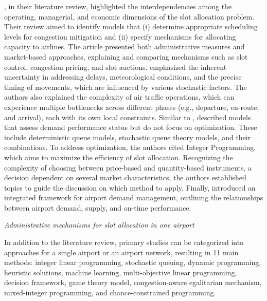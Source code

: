 , in their literature review, highlighted the interdependencies among the operating, managerial, and economic dimensions of the slot allocation problem. Their review aimed to identify models that (i) determine appropriate scheduling levels for congestion mitigation and (ii) specify mechanisms for allocating capacity to airlines. The article presented both administrative measures and market-based approaches, explaining and comparing mechanisms such as slot control, congestion pricing, and slot auctions.  emphasized the inherent uncertainty in addressing delays, meteorological conditions, and the precise timing of movements, which are influenced by various stochastic factors. The authors also explained the complexity of air traffic operations, which can experience multiple bottlenecks across different phases (e.g., departure, en-route, and arrival), each with its own local constraints. Similar to ,  described models that assess demand performance status but do not focus on optimization. These include deterministic queue models, stochastic queue theory models, and their combinations. To address optimization, the authors cited Integer Programming, which aims to maximize the efficiency of slot allocation. Recognizing the complexity of choosing between price-based and quantity-based instruments, a decision dependent on several market characteristics, the authors established topics to guide the discussion on which method to apply. Finally,  introduced an integrated framework for airport demand management, outlining the relationships between airport demand, supply, and on-time performance.

\hfill \break
\textit{Administrative mechanisms for slot allocation in one airport}
\hfill \break

In addition to the literature review, primary studies can be categorized into approaches for a single airport or an airport network, resulting in 11 main methods: integer linear programming, stochastic queuing, dynamic programming, heuristic solutions, machine learning, multi-objective linear programming, decision framework, game theory model, congestion-aware egalitarian mechanism, mixed-integer programming, and chance-constrained programming.

